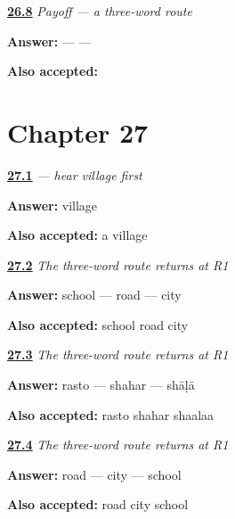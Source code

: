 \noindent\begin{minipage}[t]{\linewidth}
\raggedright
\hyperlink{review-GU-C22-route-three-payoff}{\textbf{26.8}} \emph{Payoff — a three-word route}\par
\small \textbf{Answer:}  —  — \par
\footnotesize \textbf{Also accepted:}   
\end{minipage}\par\medskip

\section*{Chapter 27}

\noindent\begin{minipage}[t]{\linewidth}
\raggedright
\hyperlink{review-GU-C23-hear-gaam-recall}{\textbf{27.1}} \emph{ — hear village first}\par
\small \textbf{Answer:} village\par
\footnotesize \textbf{Also accepted:} a village
\end{minipage}\par\medskip

\noindent\begin{minipage}[t]{\linewidth}
\raggedright
\hyperlink{review-GU-R23-route-three-r1-listening}{\textbf{27.2}} \emph{The three-word route returns at R1}\par
\small \textbf{Answer:} school — road — city\par
\footnotesize \textbf{Also accepted:} school road city
\end{minipage}\par\medskip

\noindent\begin{minipage}[t]{\linewidth}
\raggedright
\hyperlink{review-GU-R23-route-three-r1-speaking}{\textbf{27.3}} \emph{The three-word route returns at R1}\par
\small \textbf{Answer:} rasto — shahar — shāḷā\par
\footnotesize \textbf{Also accepted:} rasto shahar shaalaa
\end{minipage}\par\medskip

\noindent\begin{minipage}[t]{\linewidth}
\raggedright
\hyperlink{review-GU-R23-route-three-r1-reading}{\textbf{27.4}} \emph{The three-word route returns at R1}\par
\small \textbf{Answer:} road — city — school\par
\footnotesize \textbf{Also accepted:} road city school
\end{minipage}\par\medskip

